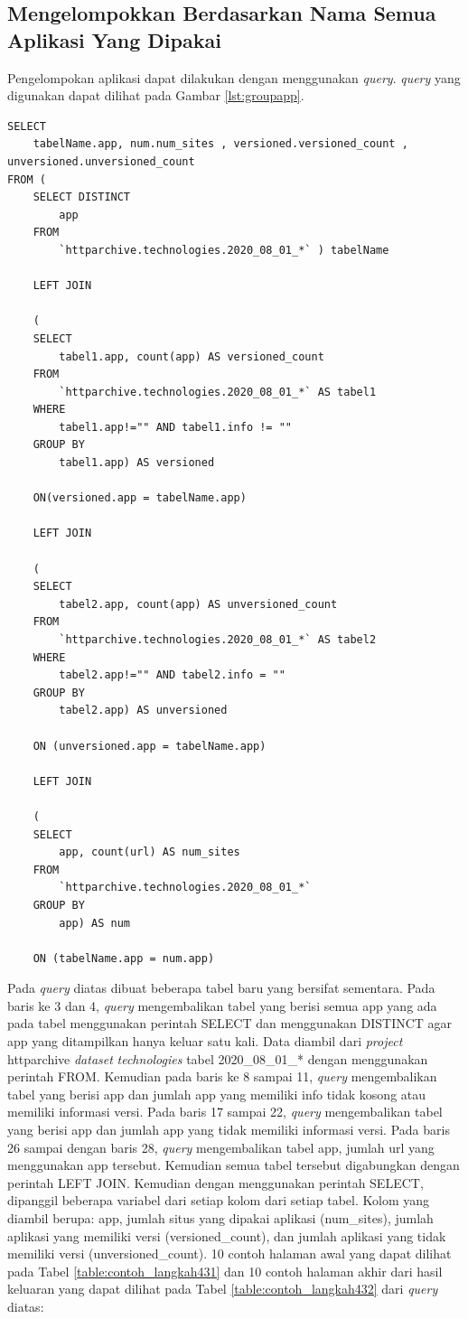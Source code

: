 \subsection{Mengelompokkan Berdasarkan Nama Semua Aplikasi Yang Dipakai}
Pengelompokan aplikasi dapat dilakukan dengan menggunakan \textit{query}. \textit{query} yang digunakan dapat dilihat pada Gambar \ref{lst:groupapp}.
\begin{lstlisting}[caption={Mengelompokan Semua Aplikasi yang Dipakai}, label={lst:groupapp}]
SELECT 
	tabelName.app, num.num_sites , versioned.versioned_count , unversioned.unversioned_count
FROM (
	SELECT DISTINCT 
		app
	FROM 
		`httparchive.technologies.2020_08_01_*` ) tabelName

	LEFT JOIN 

	(
	SELECT 
		tabel1.app, count(app) AS versioned_count
	FROM 
		`httparchive.technologies.2020_08_01_*` AS tabel1
	WHERE 
		tabel1.app!="" AND tabel1.info != "" 
	GROUP BY 
		tabel1.app) AS versioned

	ON(versioned.app = tabelName.app)

	LEFT JOIN

	(
	SELECT 
		tabel2.app, count(app) AS unversioned_count
	FROM 
		`httparchive.technologies.2020_08_01_*` AS tabel2
	WHERE 
		tabel2.app!="" AND tabel2.info = "" 
	GROUP BY 
		tabel2.app) AS unversioned

	ON (unversioned.app = tabelName.app)

	LEFT JOIN 

	(
	SELECT 
		app, count(url) AS num_sites
	FROM 
		`httparchive.technologies.2020_08_01_*`
	GROUP BY 
		app) AS num

	ON (tabelName.app = num.app)
\end{lstlisting}

Pada \textit{query} diatas dibuat beberapa tabel baru yang bersifat sementara. Pada baris ke 3 dan 4, \textit{query} mengembalikan tabel yang berisi semua app yang ada pada tabel menggunakan perintah SELECT dan menggunakan DISTINCT agar app yang ditampilkan hanya keluar satu kali. Data diambil dari \textit{project} httparchive \textit{dataset} \textit{technologies} tabel 2020\_08\_01\_* dengan menggunakan perintah FROM. Kemudian pada baris ke 8 sampai 11, \textit{query} mengembalikan tabel yang berisi app dan jumlah app yang memiliki info tidak kosong atau memiliki informasi versi. Pada baris 17 sampai 22, \textit{query} mengembalikan tabel yang berisi app dan jumlah app yang tidak memiliki informasi versi. Pada baris 26 sampai dengan baris 28, \textit{query} mengembalikan tabel app, jumlah url yang menggunakan app tersebut. Kemudian semua tabel tersebut digabungkan dengan perintah LEFT JOIN. Kemudian dengan menggunakan perintah SELECT, dipanggil beberapa variabel dari setiap kolom dari setiap tabel. Kolom yang diambil berupa: app, jumlah situs yang dipakai aplikasi (num\_sites), jumlah aplikasi yang memiliki versi (versioned\_count), dan jumlah aplikasi yang tidak memiliki versi (unversioned\_count). 10 contoh halaman awal yang dapat dilihat pada Tabel \ref{table:contoh_langkah431} dan 10 contoh halaman akhir dari hasil keluaran yang dapat dilihat pada Tabel \ref{table:contoh_langkah432} dari \textit{query} diatas:

